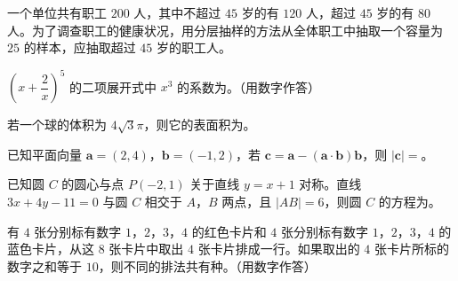 \begin{question}
一个单位共有职工 $200$ 人，其中不超过 $45$ 岁的有 $120$ 人，超过 $45$ 岁的有 $80$ 人。为了调查职工的健康状况，用分层抽样的方法从全体职工中抽取一个容量为 $25$ 的样本，应抽取超过 $45$ 岁的职工\gkblank{}人。

\end{question}
\begin{question}
$\left(x+\dfrac2x\right)^5$ 的二项展开式中 $x^3$ 的系数为\gkblank{}。（用数字作答）

\end{question}
\begin{question}
若一个球的体积为 $4\sqrt3\pi$，则它的表面积为\gkblank{}。

\end{question}
\begin{question}
已知平面向量 $\boldsymbol a=(2,4)$，$\boldsymbol b=(-1,2)$，若 $\boldsymbol c=\boldsymbol a-(\boldsymbol a\cdot\boldsymbol b)\boldsymbol b$，则 $|\boldsymbol c|=$\gkblank{}。

\end{question}
\begin{question}
已知圆 $C$ 的圆心与点 $P(-2,1)$ 关于直线 $y=x+1$ 对称。直线 $3x+4y-11=0$ 与圆 $C$ 相交于 $A$，$B$ 两点，且 $|AB|=6$，则圆 $C$ 的方程为\gkblank{}。

\end{question}
\begin{question}
有 $4$ 张分别标有数字 $1$，$2$，$3$，$4$ 的红色卡片和 $4$ 张分别标有数字 $1$，$2$，$3$，$4$ 的蓝色卡片，从这 $8$ 张卡片中取出 $4$ 张卡片排成一行。如果取出的 $4$ 张卡片所标的数字之和等于 $10$，则不同的排法共有\gkblank{}种。（用数字作答）

\end{question}

